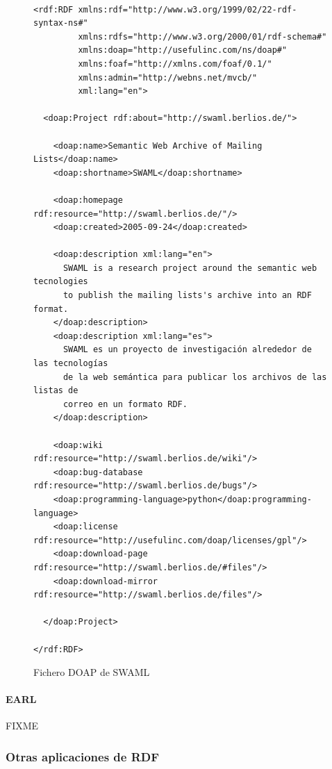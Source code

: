 \begin{figure}[ht]
\begin{verbatim}

<rdf:RDF xmlns:rdf="http://www.w3.org/1999/02/22-rdf-syntax-ns#" 
         xmlns:rdfs="http://www.w3.org/2000/01/rdf-schema#" 
         xmlns:doap="http://usefulinc.com/ns/doap#" 
         xmlns:foaf="http://xmlns.com/foaf/0.1/" 
         xmlns:admin="http://webns.net/mvcb/" 
         xml:lang="en">

  <doap:Project rdf:about="http://swaml.berlios.de/">

    <doap:name>Semantic Web Archive of Mailing Lists</doap:name>
    <doap:shortname>SWAML</doap:shortname>

    <doap:homepage rdf:resource="http://swaml.berlios.de/"/>
    <doap:created>2005-09-24</doap:created>

    <doap:description xml:lang="en">
      SWAML is a research project around the semantic web tecnologies 
      to publish the mailing lists's archive into an RDF format.
    </doap:description>
    <doap:description xml:lang="es">
      SWAML es un proyecto de investigación alrededor de las tecnologías 
      de la web semántica para publicar los archivos de las listas de 
      correo en un formato RDF.
    </doap:description>

    <doap:wiki rdf:resource="http://swaml.berlios.de/wiki"/>
    <doap:bug-database rdf:resource="http://swaml.berlios.de/bugs"/>
    <doap:programming-language>python</doap:programming-language>
    <doap:license rdf:resource="http://usefulinc.com/doap/licenses/gpl"/>
    <doap:download-page rdf:resource="http://swaml.berlios.de/#files"/>
    <doap:download-mirror rdf:resource="http://swaml.berlios.de/files"/>

  </doap:Project>

</rdf:RDF>
\end{verbatim}
	\caption{Fichero DOAP de SWAML}
	\label{fig:ejemplo.doap}
\end{figure}

\paragraph{EARL}

FIXME

\subsubsection{Otras aplicaciones de RDF}

